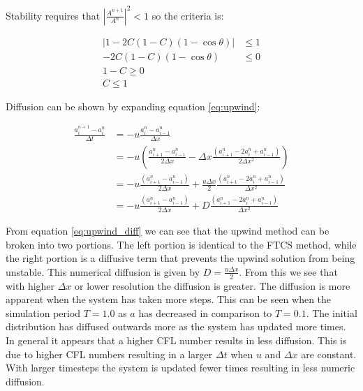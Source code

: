 Stability requires that $\left|\frac{A^{n+1}}{A^n} \right|^2 < 1$ so the criteria is:

\begin{equation}
\begin{split}
    |1 - 2C(1-C)(1-\cos\theta)| &\leq 1 \\
    -2C (1 - C)(1 - \cos\theta) &\leq 0 \\
    1 - C \geq 0 \\
    C \leq 1
\end{split}
\end{equation}

Diffusion can be shown by expanding equation \ref{eq:upwind}:

\begin{equation}
\begin{split}
     \frac{a_i^{n+1} - a_i^n}{\Delta t} &= -u \frac{a_i^{n} - a_{i-1}^n}{\Delta x} \\
                                        &= -u \left(\frac{a_{i+1}^n - a_{i-1}^n}{2\Delta x} - \Delta x \frac{(a_{i+1}^n - 2a_i^n + a_{i-1}^n)}{2\Delta x^2} \right) \\
                                        &= -u \frac{(a_{i+1}^n - a_{i-1}^n)}{2\Delta x} + \frac{u \Delta x}{2} \frac{(a_{i+1}^n - 2a_i^n + a_{i-1}^n)}{\Delta x^2} \\
                                        &= -u \frac{(a_{i+1}^n - a_{i-1}^n)}{2\Delta x} + D \frac{(a_{i+1}^n - 2a_i^n + a_{i-1}^n)}{\Delta x^2} 
\end{split}
\label{eq:upwind_diff}
\end{equation}

From equation \ref{eq:upwind_diff} we can see that the upwind method can be broken into two portions. The left portion is identical to the FTCS method, while the right portion is a diffusive term that prevents the upwind solution from being unstable. This numerical diffusion is given by $D = \frac{u \Delta x}{2}$. From this we see that with higher $\Delta x$ or lower resolution the diffusion is greater. The diffusion is more apparent when the system has taken more steps. This can be seen when the simulation period $T = 1.0$ as $a$ has decreased in comparison to $T = 0.1$. The initial distribution has diffused outwards more as the system has updated more times. In general it appears that a higher CFL number results in less diffusion. This is due to higher CFL numbers resulting in a larger $\Delta t$ when $u$ and $\Delta x$ are constant. With larger timesteps the system is updated fewer times resulting in less numeric diffusion.